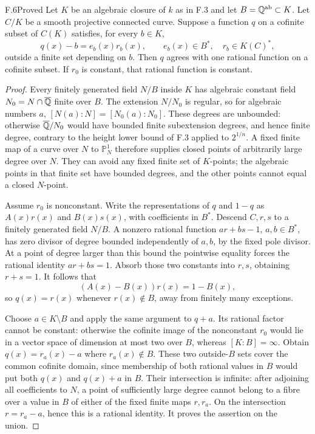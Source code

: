 \begin{claim}{F.6}{Proved}
Let $K$ be an algebraic closure of $k$ as in F.3 and let
$B=\mathbb Q^{\mathrm{ab}}\subset K$. Let $C/K$ be a smooth projective
connected curve. Suppose a function $q$ on a cofinite subset of
$C(K)$ satisfies, for every $b\in K$,
\[
 q(x)-b=e_b(x)r_b(x),\qquad e_b(x)\in B^*,
 \quad r_b\in K(C)^*,
\]
outside a finite set depending on $b$. Then $q$ agrees with one
rational function on a cofinite subset. If $r_0$ is constant, that
rational function is constant.
\end{claim}
\begin{proof}
Every finitely generated field $N/B$ inside $K$ has algebraic
constant field $N_0=N\cap\overline{\mathbb Q}$ finite over $B$. The
extension $N/N_0$ is regular, so for algebraic numbers $a$,
$[N(a):N]=[N_0(a):N_0]$. These degrees are unbounded: otherwise
$\overline{\mathbb Q}/N_0$ would have bounded finite subextension degrees,
and hence finite degree, contrary to the height lower bound of F.3
applied to $2^{1/n}$. A fixed finite map of a curve over $N$ to
$\mathbb P^1_N$ therefore supplies closed points of arbitrarily
large degree over $N$. They can avoid any fixed finite set of
$K$-points; the algebraic points in that finite set have bounded
degrees, and the other points cannot equal a closed $N$-point.

Assume $r_0$ is nonconstant. Write the representations of $q$ and
$1-q$ as $A(x)r(x)$ and $B(x)s(x)$, with coefficients in $B^*$.
Descend $C,r,s$ to a finitely generated field $N/B$. A nonzero
rational function $a r+b s-1$, $a,b\in B^*$, has zero divisor of
degree bounded independently of $a,b$, by the fixed pole divisor.
At a point of degree larger than this bound the pointwise equality
forces the rational identity $a r+b s=1$. Absorb those two constants
into $r,s$, obtaining $r+s=1$. It follows that
\[
 (A(x)-B(x))r(x)=1-B(x),
\]
so $q(x)=r(x)$ whenever $r(x)\notin B$, away from finitely many
exceptions.

Choose $a\in K\setminus B$ and apply the same argument to $q+a$.
Its rational factor cannot be constant: otherwise the cofinite
image of the nonconstant $r_0$ would lie in a vector space of
dimension at most two over $B$, whereas $[K:B]=\infty$. Obtain
$q(x)=r_a(x)-a$ where $r_a(x)\notin B$. These two outside-$B$ sets
cover the common cofinite domain, since membership of both rational
values in $B$ would put both $q(x)$ and $q(x)+a$ in $B$.
Their intersection is infinite: after adjoining all coefficients
to $N$, a point of sufficiently large degree cannot belong to a
fibre over a value in $B$ of either of the fixed finite maps $r,r_a$.
On the intersection $r=r_a-a$, hence this is a rational identity.
It proves the assertion on the union.


\end{proof}
